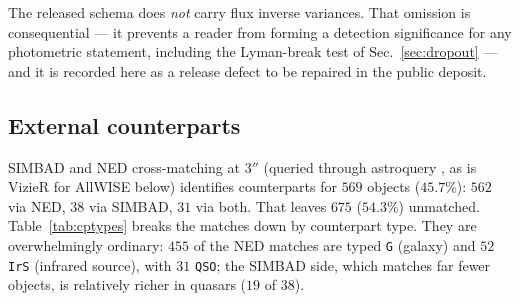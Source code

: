 \documentclass[aps,prd,twocolumn,superscriptaddress,nofootinbib,longbibliography,floatfix]{revtex4-2}
\begin{document}
The released schema does \emph{not} carry flux inverse variances. That
omission is consequential --- it prevents a reader from forming a detection
significance for any photometric statement, including the Lyman-break test of
Sec.~\ref{sec:dropout} --- and it is recorded here as a release defect to be
repaired in the public deposit.

\subsection{External counterparts}
SIMBAD \cite{SIMBAD} and NED \cite{NED} cross-matching at $3''$ (queried
through astroquery \cite{Ginsburg2019}, as is VizieR \cite{VizieR} for
AllWISE below) identifies counterparts for $569$ objects ($45.7\%$): $562$
via NED, $38$ via SIMBAD, $31$ via both.
That leaves $675$ ($54.3\%$) unmatched. Table~\ref{tab:cptypes} breaks the
matches down by counterpart type. They are overwhelmingly ordinary: $455$ of
the NED matches are typed \texttt{G} (galaxy) and $52$ \texttt{IrS} (infrared
source), with $31$ \texttt{QSO}; the SIMBAD side, which matches far fewer
objects, is relatively richer in quasars ($19$ of $38$).

\begin{table}[t]
\caption{Counterpart types of the $569$ matched objects, listed per service
(columns are not disjoint: $31$ objects match both, so NED's $562$ and
SIMBAD's $38$ sum to $600$). All $8$ distinct NED types and all $6$ distinct
SIMBAD types are shown; nothing is truncated. NED types dominate by count;
SIMBAD matches fewer objects but a larger quasar fraction.}
\label{tab:cptypes}

\end{table}
\end{document}
